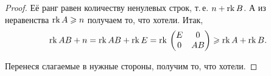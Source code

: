 \begin{proof}
    Её ранг равен количеству ненулевых строк, т.\,е. $n + \mathrm{rk}\, B$. А из неравенства $\mathrm{rk}\, A \geqslant n$ получаем то, что хотели. Итак,
    $$
    \mathrm{rk}\, AB + n = \mathrm{rk}\, AB + \mathrm{rk}\, E = \mathrm{rk}\,
    \begin{pmatrix}
        E & 0\\
        0 & AB
    \end{pmatrix} \geqslant \mathrm{rk}\, A + \mathrm{rk}\, B.
    $$

    Перенеся слагаемые в нужные стороны, получим то, что хотели.
\end{proof}



